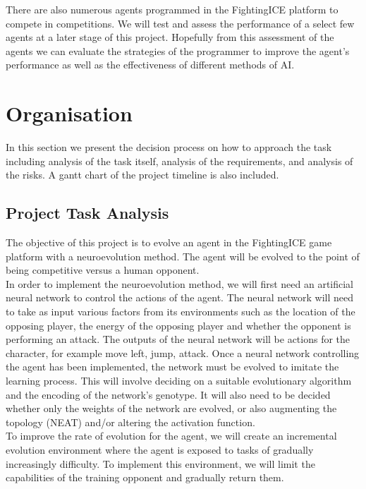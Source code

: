 \documentclass[11pt,a4paper]{article}
\begin{document}
There are also numerous agents programmed in the FightingICE platform to compete in competitions. \cite{fightingice} We will test and assess the performance of a select few agents at a later stage of this project. Hopefully from this assessment of the agents we can evaluate the strategies of the programmer to improve the agent's performance as well as the effectiveness of different methods of AI.

\newpage
\section{Organisation}
In this section we present the decision process on how to approach the task including analysis of the task itself, analysis of the requirements, and analysis of the risks. A gantt chart of the project timeline is also included.
\subsection{Project Task Analysis}
The objective of this project is to evolve an agent in the FightingICE game platform with a neuroevolution method. The agent will be evolved to the point of being competitive versus a human opponent. \\

In order to implement the neuroevolution method, we will first need an artificial neural network to control the actions of the agent. The neural network will need to take as input various factors from its environments such as the location of the opposing player, the energy of the opposing player and whether the opponent is performing an attack. The outputs of the neural network will be actions for the character, for example move left, jump, attack. Once a neural network controlling the agent has been implemented, the network must be evolved to imitate the learning process. This will involve deciding on a suitable evolutionary algorithm and the encoding of the network's genotype. It will also need to be decided whether only the weights of the network are evolved, or also augmenting the topology (NEAT) and/or altering the activation function.\\

To improve the rate of evolution for the agent, we will create an incremental evolution environment where the agent is exposed to tasks of gradually increasingly difficulty. To implement this environment, we will limit the capabilities of the training opponent and gradually return them.\\
\end{document}
